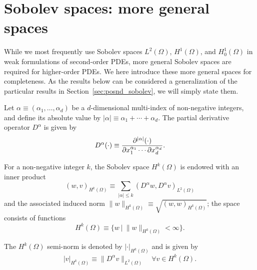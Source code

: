 \section{Sobolev spaces: more general spaces}
While we most frequently use Sobolev spaces $L^2(\Omega)$, $H^1(\Omega)$, and $H^1_0(\Omega)$ in weak formulations of second-order PDEs, more general Sobolev spaces are required for higher-order PDEs.  We here introduce these more general spaces for completeness.  As the results below can be considered a generalization of the particular results in Section~\ref{sec:posnd_sobolev}, we will simply state them.
\begin{definition}
  Let $\alpha \equiv (\alpha_1, \dots, \alpha_d)$ be a $d$-dimensional multi-index of non-negative integers, and define its absolute value by $|\alpha| \equiv \alpha_1 + \cdots + \alpha_d$. The partial derivative operator $D^\alpha$ is given by 
  \begin{equation*}
    D^\alpha (\cdot)  \equiv \frac{\partial ^{|\alpha|} (\cdot)}{\partial x_1^{\alpha_1}  \cdots \partial x_d^{\alpha_d}}.
  \end{equation*}
\end{definition}
\begin{definition}
  For a non-negative integer $k$, the Sobolev space $H^k(\Omega)$ is endowed with an inner product
  \begin{equation*}
    (w,v)_{H^k(\Omega)} \equiv \sum_{|\alpha| \leq k} (D^\alpha w, D^\alpha v)_{L^2(\Omega)}
  \end{equation*}
  and the associated induced norm $\| w \|_{H^k(\Omega)} \equiv \sqrt{(w,w)_{H^k(\Omega)}}$; the space consists of functions
  \begin{equation*}
    H^k(\Omega) \equiv \{ w \ | \ \| w \|_{H^k(\Omega)} < \infty \}.
  \end{equation*}
\end{definition} 
\begin{definition}
  The $H^k(\Omega)$ semi-norm is denoted by $| \cdot |_{H^k(\Omega)}$ and is given by
  \begin{equation*}
    | v |_{H^k(\Omega)} \equiv \| D^\alpha v \|_{L^2(\Omega)} \quad \forall v \in H^k(\Omega).
  \end{equation*}  
\end{definition}
